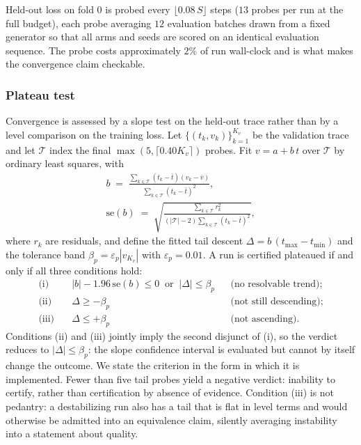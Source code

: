 \documentclass[final,5p,times,twocolumn]{elsarticle}
\theoremstyle{remark}
\begin{document}
Held-out loss on fold $0$ is probed every $\lfloor 0.08\,S \rfloor$ steps
($13$ probes per run at the full budget), each probe averaging $12$ evaluation
batches drawn from a fixed generator so that all arms and seeds are scored on
an identical evaluation sequence. The probe costs approximately $2\%$ of run
wall-clock and is what makes the convergence claim checkable.

\subsubsection{Plateau test}

Convergence is assessed by a slope test on the held-out trace rather
than by a level comparison on the training loss. Let
$\{(t_{k}, v_{k})\}_{k=1}^{K_{v}}$ be the validation trace and let
$\mathcal{T}$ index the final $\max(5, \lceil 0.40 K_{v}\rceil)$ probes. Fit
$v = a + b\,t$ over $\mathcal{T}$ by ordinary least squares, with
\begin{equation}
\label{eq:slope}
\begin{gathered}
b \;=\; \frac{\sum_{k\in\mathcal{T}}(t_{k}-\bar{t})(v_{k}-\bar{v})}
{\sum_{k\in\mathcal{T}}(t_{k}-\bar{t})^{2}},\\[0.8ex]
\mathrm{se}(b) \;=\;
\sqrt{\frac{\sum_{k\in\mathcal{T}} r_{k}^{2}}
{(|\mathcal{T}|-2)\sum_{k\in\mathcal{T}}(t_{k}-\bar{t})^{2}}},
\end{gathered}
\end{equation}
where $r_{k}$ are residuals, and define the fitted tail descent
$\Delta = b\,(t_{\max}-t_{\min})$ and the tolerance band
$\beta_{p} = \varepsilon_{p}|v_{K_{v}}|$ with $\varepsilon_{p} = 0.01$. A run is
certified plateaued if and only if all three conditions hold:
\begin{align}
\label{eq:plateau}
\text{(i)}\quad & |b| - 1.96\,\mathrm{se}(b) \leq 0 \;\;\text{or}\;\; |\Delta| \leq \beta_{p}
&& \text{(no resolvable trend);}\nonumber\\
\text{(ii)}\quad & \Delta \geq -\beta_{p} && \text{(not still descending);}\\
\text{(iii)}\quad & \Delta \leq +\beta_{p} && \text{(not ascending).}\nonumber
\end{align}
Conditions (ii) and (iii) jointly imply the second disjunct of (i), so the
verdict reduces to $|\Delta| \leq \beta_{p}$: the slope confidence interval is
evaluated but cannot by itself change the outcome. We state the criterion in
the form in which it is implemented. Fewer than five tail probes yield a
negative verdict: inability to certify, rather than certification by absence
of evidence. Condition (iii) is not
pedantry: a destabilizing run also has a tail that is flat in level terms and
would otherwise be admitted into an equivalence claim, silently averaging
instability into a statement about quality.
\end{document}
